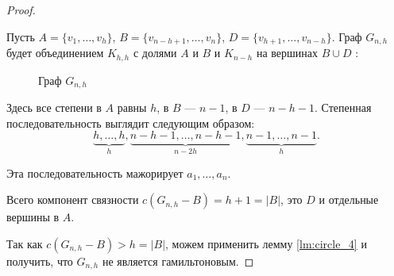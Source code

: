 \begin{proof}
\begin{description}
			Пусть $A = \{v_1, \ldots , v_h\}$, $B = \{v_{n-h+1}, \ldots , v_n\}$, $D = \{v_{h+1}, \ldots, v_{n-h} \}$. Граф $G_{n, h}$ будет объединением $K_{h, h}$ с долями $A$ и $B$ и $K_{n-h}$ на вершинах $B \cup D$ :
		\begin{figure}[ht]
			\centering
			\caption{Граф $G_{n,h}$}
			\label{fig:existing-gamiltonov-cycle}
		\end{figure}
	\end{description}

	Здесь все степени в $A$ равны $h$, в $B$ --- $n-1$, в $D$ --- $n-h-1$. Степенная последовательность выглядит следующим образом:
	 \[
		 \underbrace{h, \ldots , h}_{h}, \underbrace{n-h-1, \ldots , n-h-1}_{n-2h}, \underbrace{n-1, \ldots , n-1}_{h}
	.\] 

	Эта последовательность мажорирует $a_1, \ldots , a_n$.
	
	Всего компонент связности $c(G_{n,h} - B) = h+1 = \lvert B \rvert$, это $D$ и отдельные вершины в $A$.

	Так как $c(G_{n,h}-B) >h = \lvert B \rvert$, можем применить лемму \ref{lm:circle_4} и получить, что $G_{n, h}$ не является гамильтоновым.

\end{proof}
